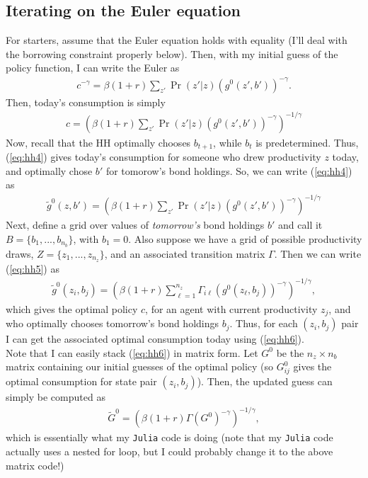 \documentclass[12pt]{article}
\newcommand{\mtx}[1]{\ensuremath{\bm{\mathit{#1}}}}
\begin{document}
\subsection{Iterating on the Euler equation}
For starters, assume that the Euler equation holds with equality (I'll deal with the borrowing constraint properly below). Then, with my initial guess of the policy function, I can write the Euler as
\begin{align*}
c^{-\gamma} = \beta(1+r) \sum_{z'}\Pr(z'|z)(g^0(z',b'))^{-\gamma}.
\end{align*}
Then, today's consumption is simply
\begin{align}
c = \left( \beta(1+r) \sum_{z'}\Pr(z'|z)(g^0(z',b'))^{-\gamma}\right)^{-1/\gamma} \label{eq:hh4}
\end{align}
Now, recall that the HH optimally chooses $b_{t+1}$, while $b_t$ is predetermined. Thus, (\ref{eq:hh4}) gives today's consumption for someone who drew productivity $z$ today, and optimally chose $b'$ for tomorow's bond holdings. So, we can write (\ref{eq:hh4}) as
\begin{align}
\tilde g^0(z,b') = \left( \beta(1+r) \sum_{z'}\Pr(z'|z)(g^0(z',b'))^{-\gamma}\right)^{-1/\gamma} \label{eq:hh5}
\end{align}
Next, define a grid over values of \textit{tomorrow's} bond holdings $b'$ and call it $B = \{b_1, ...,b_{n_b}\}$, with $b_1 = 0$. Also suppose we have a grid of possible productivity draws, $Z=\{z_1, ..., z_{n_z}\}$, and an associated transition matrix $\Gamma$. Then we can write (\ref{eq:hh5}) as
\begin{align}
\tilde g^0(z_i,b_j) = \left( \beta(1+r) \sum_{\ell=1}^{n_z}\Gamma_{i\ell} (g^0(z_\ell,b_j))^{-\gamma}\right)^{-1/\gamma} \label{eq:hh6}, 
\end{align}
which gives the optimal policy $c$, for an agent with current productivity $z_j$, and who optimally chooses tomorrow's bond holdings $b_j$. Thus, for each $(z_i,b_j)$ pair I can get the associated optimal consumption today using (\ref{eq:hh6}).\\

Note that I can easily stack (\ref{eq:hh6}) in matrix form. Let $\mtx{G}^0$ be the $n_z \times n_b$ matrix containing our initial guesses of the optimal policy (so $\mtx{G}^0_{ij}$ gives the optimal consumption for state pair $(z_i,b_j)$). Then, the updated guess can simply be computed as
\begin{align*}
\widetilde{\mtx{G}}^0 = \left( \beta(1+r) \mtx{\Gamma} (\mtx{G}^0)^{-\gamma}\right)^{-1/\gamma},
\end{align*}
which is essentially what my \verb|Julia| code is doing (note that my \verb|Julia| code actually uses a nested for loop, but I could probably change it to the above matrix code!)\\
\end{document}
